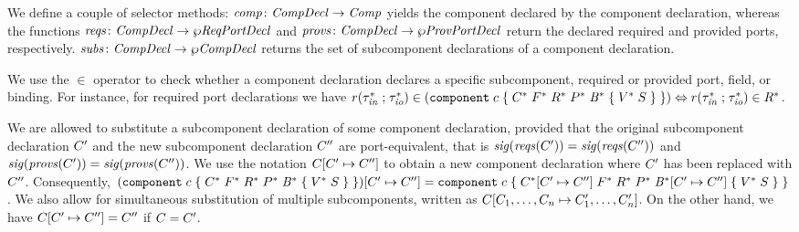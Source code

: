 \documentclass[a4paper,10pt,english]{article}
\begin{document}
We define a couple of selector methods: $\mathit{comp} \colon \mathit{CompDecl} \rightarrow \mathit{Comp}$ yields the component declared by the
component declaration, whereas the functions $\mathit{reqs} \colon \mathit{CompDecl} \rightarrow \wp \mathit{ReqPortDecl}$ and $\mathit{provs} \colon
\mathit{CompDecl} \rightarrow \wp \mathit{ProvPortDecl}$ return the declared required and provided ports, respectively. $\mathit{subs} \colon \mathit{CompDecl} \rightarrow
\wp \mathit{CompDecl}$ returns the set of subcomponent declarations of a component declaration.


We use the $\in$ operator to check whether a component declaration declares a specific subcomponent, required or provided port,
field, or binding.
For instance, for required port declarations we have
$r \mathtt{(} \tau_\mathit{in}^* \; \mathtt{;} \; \tau_\mathit{io}^* \mathtt{)} \in
(\texttt{component} \; c \; \mathtt{\{} \; C^* \; F^* \; R^* \; P^* \; \mathit{B}^* \; \mathtt{\{} \; V^* \; S \; \mathtt{\}} \; \mathtt{\}})
\Leftrightarrow r \mathtt{(} \tau_\mathit{in}^* \; \mathtt{;} \; \tau_\mathit{io}^* \mathtt{)} \in R^*$.

We are allowed to substitute a subcomponent declaration of some component declaration, provided that
the original subcomponent declaration $C'$ and the new subcomponent declaration $C''$ are port-equivalent, that is
$\mathit{sig}(\mathit{reqs}(C')) = \mathit{sig}(\mathit{reqs}(C''))$ and $\mathit{sig}(\mathit{provs}(C')) =
\mathit{sig}(\mathit{provs}(C''))$.
We use the notation $C[C' \mapsto C'']$ to obtain a new component declaration
where $C'$ has been replaced with $C''$. Consequently,
$(\texttt{component} \; c \; \mathtt{\{} \; C^* \; F^* \; R^* \; P^* \; \mathit{B}^* \; \mathtt{\{} \; V^* \; S \; \mathtt{\}} \; \mathtt{\}})[C'
\mapsto C''] =
\texttt{component} \; c \; \mathtt{\{} \; C^*[C'
\mapsto C''] \; F^* \; R^* \; P^* \; \mathit{B}^*[C'
\mapsto C''] \; \mathtt{\{} \; V^* \; S \; \mathtt{\}} \; \mathtt{\}}$. We also allow for simultaneous substitution of multiple subcomponents, written as
$C[C_1, \ldots, C_n \mapsto C_1', \ldots, C_n']$. On the other hand, we have
$C[C' \mapsto C''] = C''$ if $C = C'$.
\end{document}
